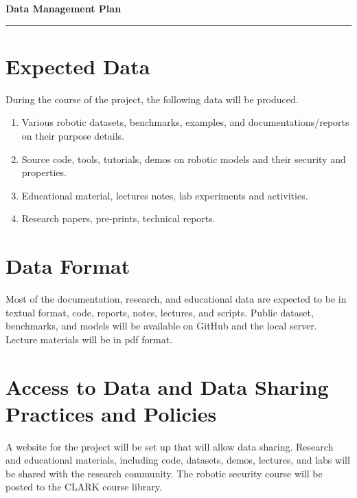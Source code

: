 
{\Large\bfseries\filcenter
Data Management Plan
\\\rule{\textwidth}{0.4pt}}

\setcounter{section}{0}
\section{Expected Data}

During the course of the project, the following data will be produced.
\begin{enumerate}
    \item Various robotic datasets, benchmarks, examples, and documentations/reports on their purpose details.
    \item Source code, tools, tutorials, demos on robotic models and their security and properties.
    \item Educational material, lectures notes, lab experiments and activities.
    \item Research papers, pre-prints, technical reports.
\end{enumerate}

\section{Data Format}

Most of the documentation, research, and educational data are expected to be in textual format, \eg code, reports, notes, lectures, and scripts. 
Public dataset, benchmarks, and models will be available on GitHub and the local server. 
Lecture materials will be in pdf format.

\section{Access to Data and Data Sharing Practices and Policies}

A website for the project will be set up that will allow data sharing. Research and educational materials, including code, datasets, demos, lectures, and labs will be shared with the research community. 
The robotic security course will be posted to the CLARK course library.


